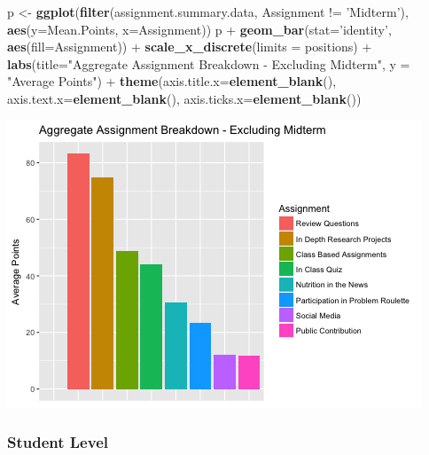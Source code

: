 \documentclass[]{article}
\newenvironment{Shaded}{\begin{snugshade}}{\end{snugshade}}
\newcommand{\KeywordTok}[1]{\textcolor[rgb]{0.13,0.29,0.53}{\textbf{{#1}}}}
\newcommand{\DataTypeTok}[1]{\textcolor[rgb]{0.13,0.29,0.53}{{#1}}}
\newcommand{\StringTok}[1]{\textcolor[rgb]{0.31,0.60,0.02}{{#1}}}
\newcommand{\NormalTok}[1]{{#1}}
\begin{document}
\begin{Shaded}
\begin{Highlighting}[]
\NormalTok{p <-}\StringTok{ }\KeywordTok{ggplot}\NormalTok{(}\KeywordTok{filter}\NormalTok{(assignment.summary.data, Assignment !=}\StringTok{ 'Midterm'}\NormalTok{), }\KeywordTok{aes}\NormalTok{(}\DataTypeTok{y=}\NormalTok{Mean.Points, }\DataTypeTok{x=}\NormalTok{Assignment))}
\NormalTok{p +}\StringTok{ }\KeywordTok{geom_bar}\NormalTok{(}\DataTypeTok{stat=}\StringTok{'identity'}\NormalTok{, }\KeywordTok{aes}\NormalTok{(}\DataTypeTok{fill=}\NormalTok{Assignment)) +}\StringTok{ }\KeywordTok{scale_x_discrete}\NormalTok{(}\DataTypeTok{limits =} \NormalTok{positions) +}\StringTok{   }
\StringTok{  }\KeywordTok{labs}\NormalTok{(}\DataTypeTok{title=}\StringTok{"Aggregate Assignment Breakdown - Excluding Midterm"}\NormalTok{, }\DataTypeTok{y =} \StringTok{"Average Points"}\NormalTok{) +}
\StringTok{  }\KeywordTok{theme}\NormalTok{(}\DataTypeTok{axis.title.x=}\KeywordTok{element_blank}\NormalTok{(),}
        \DataTypeTok{axis.text.x=}\KeywordTok{element_blank}\NormalTok{(),}
        \DataTypeTok{axis.ticks.x=}\KeywordTok{element_blank}\NormalTok{())}
\end{Highlighting}
\end{Shaded}

\includegraphics{figures/points-from-assessments-summary-2.png}

\subsubsection{Student Level}\label{student-level}
\end{document}
